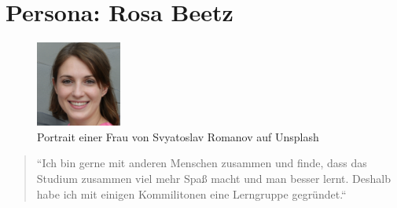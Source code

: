\documentclass{article}
\begin{document}
\newpage

\section{Persona: Rosa Beetz}

\begin{figure}[h]
	\includegraphics[width=0.25\textwidth]{rosa}
	\centering
	\caption{Portrait einer Frau von Svyatoslav Romanov auf Unsplash}
\end{figure}

\begin{quote}
	\large{``Ich bin gerne mit anderen Menschen zusammen und finde, dass das Studium
		zusammen viel mehr Spaß macht und man besser lernt. Deshalb habe ich mit einigen
		Kommilitonen eine Lerngruppe gegründet.``}
\end{quote}
\end{document}
